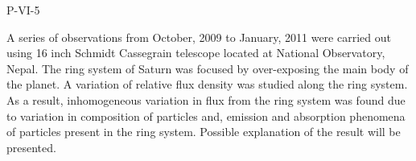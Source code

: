 P-VI-5


\bigskip



\bigskip

\noindent A series of observations from October, 2009 to January, 2011 were carried out using 16 inch Schmidt Cassegrain telescope located at National Observatory, Nepal. The ring system of Saturn was focused by over-exposing the main body of the planet. A variation of relative flux density was studied along the ring system. As a result, inhomogeneous variation in flux from the ring system was found due to variation in composition of particles and, emission and absorption phenomena of particles present in the ring system. Possible explanation of the result will be presented.
